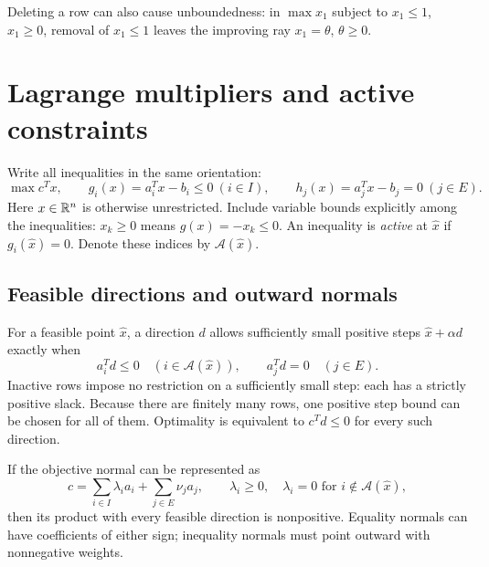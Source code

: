 \documentclass[11pt,a4paper]{article}
\begin{document}
Deleting a row can also cause unboundedness: in $\max x_1$ subject to
$x_1\leq1$, $x_1\geq0$, removal of $x_1\leq1$ leaves the improving ray
$x_1=\theta$, $\theta\geq0$.

\section{Lagrange multipliers and active constraints}\label{sec:lagrange}
Write all inequalities in the same orientation:
\[
  \max c^Tx,\qquad g_i(x)=a_i^Tx-b_i\leq0\ (i\in I),\qquad
  h_j(x)=a_j^Tx-b_j=0\ (j\in E).
\]
Here $x\in\mathbb{R}^n$ is otherwise unrestricted. Include variable bounds explicitly
among the inequalities: $x_k\geq0$ means $g(x)=-x_k\leq0$.
An inequality is \emph{active} at $\hat x$ if $g_i(\hat x)=0$.
Denote these indices by $\mathcal A(\hat x)$.

\subsection{Feasible directions and outward normals}
For a feasible point $\hat x$, a direction $d$ allows sufficiently small
positive steps $\hat x+\alpha d$ exactly when
\[
  a_i^Td\leq0\quad(i\in\mathcal A(\hat x)),\qquad
  a_j^Td=0\quad(j\in E).
\]
Inactive rows impose no restriction on a sufficiently small step: each has
a strictly positive slack. Because there are finitely many rows, one
positive step bound can be chosen for all of them.
Optimality is equivalent to $c^Td\leq0$ for every such direction.

If the objective normal can be represented as
\begin{equation}\label{eq:normal-representation}
  c=\sum_{i\in I}\lambda_i a_i+\sum_{j\in E}\nu_j a_j,\qquad
  \lambda_i\geq0,\quad
  \lambda_i=0\text{ for }i\notin\mathcal A(\hat x),
\end{equation}
then its product with every feasible direction is nonpositive.
Equality normals can have coefficients of either sign; inequality normals
must point outward with nonnegative weights.
\end{document}
